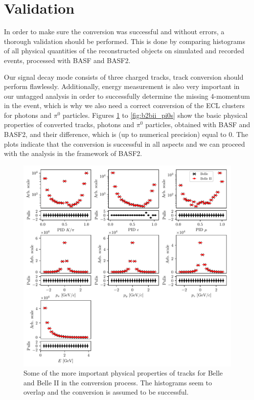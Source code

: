 \section{Validation}

In order to make sure the conversion was successful and without errors, a thorough validation should be performed. This is done by comparing histograms of all physical quantities of the reconstructed objects on simulated and recorded events, processed with BASF and BASF2. 

Our signal decay mode consists of three charged tracks, track conversion should perform flawlessly. Additionally, energy measurement is also very important in our untagged analysis in order to successfully determine the missing 4-momentum in the event, which is why we also need a correct conversion of the ECL clusters for photons and $\pi^0$ particles. Figures \ref{fig:b2bii_tracks} to \ref{fig:b2bii_pi0s} show the basic physical properties of converted tracks, photons and $\pi^0$ particles, obtained with BASF and BASF2, and their difference, which is (up to numerical precision) equal to 0. The plots indicate that the conversion is successful in all aspects and we can proceed with the analysis in the framework of BASF2.

\begin{figure}[H]
	\centering
	\captionsetup{width=0.8\linewidth}
	\includegraphics[width=\linewidth]{fig/b2bii_tracks}
	\caption{Some of the more important physical properties of tracks for Belle and Belle II in the conversion process. The histograms seem to overlap and the conversion is assumed to be successful.}
	\label{fig:b2bii_tracks}
\end{figure}

